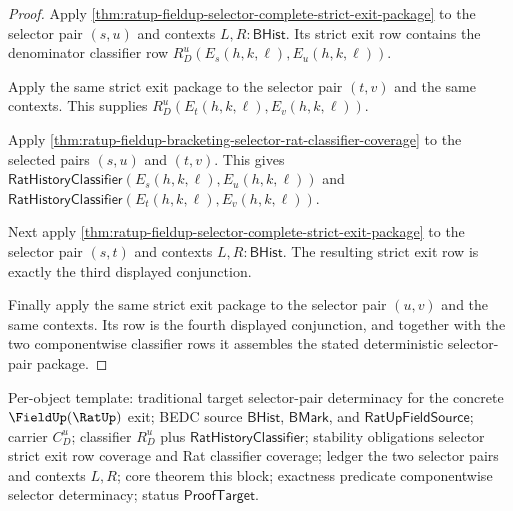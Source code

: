 \begin{proof}
Apply \autoref{thm:ratup-fieldup-selector-complete-strict-exit-package} to the
selector pair $(s,u)$ and contexts $L,R:\mathsf{BHist}$. Its strict exit row
contains the denominator classifier row
$R_D^u(E_s(h,k,\ell),E_u(h,k,\ell))$.

Apply the same strict exit package to the selector pair $(t,v)$ and the same
contexts. This supplies $R_D^u(E_t(h,k,\ell),E_v(h,k,\ell))$.

Apply \autoref{thm:ratup-fieldup-bracketing-selector-rat-classifier-coverage} to
the selected pairs $(s,u)$ and $(t,v)$. This gives
$\mathsf{RatHistoryClassifier}(E_s(h,k,\ell),E_u(h,k,\ell))$ and
$\mathsf{RatHistoryClassifier}(E_t(h,k,\ell),E_v(h,k,\ell))$.

Next apply \autoref{thm:ratup-fieldup-selector-complete-strict-exit-package} to
the selector pair $(s,t)$ and contexts $L,R:\mathsf{BHist}$. The resulting
strict exit row is exactly the third displayed conjunction.

Finally apply the same strict exit package to the selector pair $(u,v)$ and the
same contexts. Its row is the fourth displayed conjunction, and together with
the two componentwise classifier rows it assembles the stated deterministic
selector-pair package.
\end{proof}

Per-object template: traditional target selector-pair determinacy for the
concrete $\FieldUp(\RatUp)$ exit; BEDC source $\mathsf{BHist}$,
$\mathsf{BMark}$, and $\mathsf{RatUpFieldSource}$; carrier $C_D^u$; classifier
$R_D^u$ plus $\mathsf{RatHistoryClassifier}$; stability obligations selector
strict exit row coverage and Rat classifier coverage; ledger the two selector
pairs and contexts $L,R$; core theorem this block; exactness predicate
componentwise selector determinacy; status $\mathsf{ProofTarget}$.

